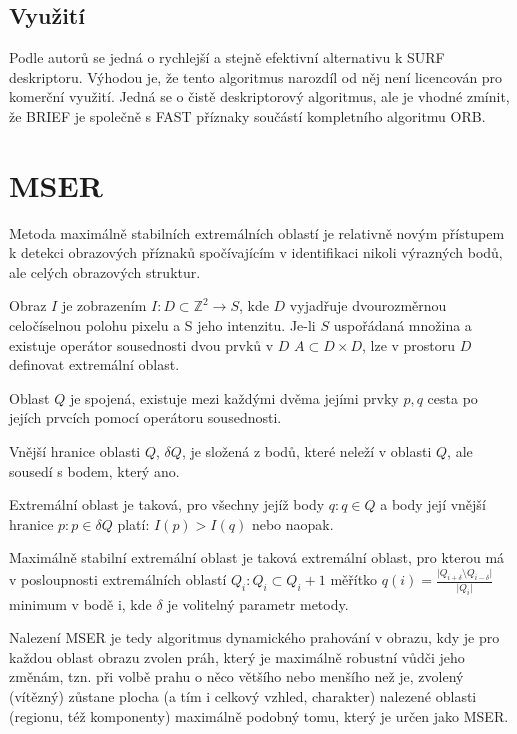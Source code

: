 	\subsection{Využití}
	
			Podle autorů se jedná o rychlejší a stejně efektivní alternativu k SURF deskriptoru. Výhodou je, že tento algoritmus narozdíl od něj není licencován pro komerční využití. Jedná se o čistě deskriptorový algoritmus, ale je vhodné zmínit, že BRIEF je společně s FAST příznaky součástí kompletního algoritmu ORB.
		
\section{MSER}


	Metoda maximálně stabilních extremálních oblastí je relativně novým přístupem k detekci obrazových příznaků spočívajícím v identifikaci nikoli výrazných bodů, ale celých obrazových struktur.
	
	Obraz $I$ je zobrazením $I: D \subset \mathbb{Z}^2 \rightarrow S$, kde $D$ vyjadřuje dvourozměrnou celočíselnou polohu pixelu a S jeho intenzitu. Je-li $S$ uspořádaná množina a existuje operátor sousednosti dvou prvků v $D$ $A \subset D\times D$, lze v prostoru $D$ definovat extremální oblast.
	
	Oblast $Q$ je spojená, existuje mezi každými dvěma jejími prvky $p, q$ cesta po jejích prvcích pomocí operátoru sousednosti.
	
	Vnější hranice oblasti $Q$, $\delta Q$, je složená z bodů, které neleží v oblasti $Q$, ale sousedí s bodem, který ano.
	
	Extremální oblast je taková, pro všechny jejíž body $q: q \in Q$ a body její vnější hranice $p: p \in \delta Q$ platí: $I(p) > I(q)$ nebo naopak.
	
	Maximálně stabilní extremální oblast je taková extremální oblast, pro kterou má v posloupnosti extremálních oblastí $Q_i : Q_i \subset Q_i+1$ měřítko $q(i) = \frac{\lvert Q_{i+\delta} \setminus Q_{i-\delta} \rvert}{\lvert Q_i \rvert}$ minimum v bodě i, kde $\delta$ je volitelný parametr metody.
	
	Nalezení MSER je tedy algoritmus dynamického prahování v obrazu, kdy je pro každou oblast obrazu zvolen práh, který je maximálně robustní vůdči jeho změnám, tzn. při volbě prahu o něco většího nebo menšího než je, zvolený (vítězný) zůstane plocha (a tím i celkový vzhled, charakter) nalezené oblasti (regionu, též komponenty) maximálně podobný tomu, který je určen jako MSER.
	
